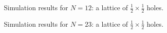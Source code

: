 \begin{figure}[H]
\caption{\label{fig:n12}Simulation results for $N=12$: a lattice of $\frac{1}{2} \times \frac{1}{2}$ holes.}
\end{figure}

\begin{figure}[H]
\caption{\label{fig:n23}Simulation results for $N=23$: a lattice of $\frac{1}{2} \times \frac{1}{2}$ holes.}
\end{figure}

